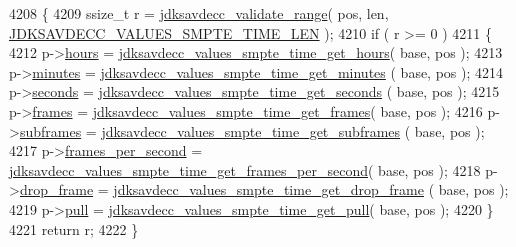 \begin{DoxyCode}
4208 \{
4209     ssize\_t r = \hyperlink{group__util_ga9c02bdfe76c69163647c3196db7a73a1}{jdksavdecc\_validate\_range}( pos, len, 
      \hyperlink{group__values__smpte__time_ga479451e2d80f4c927b20ef6007ff18d7}{JDKSAVDECC\_VALUES\_SMPTE\_TIME\_LEN} );
4210     \textcolor{keywordflow}{if} ( r >= 0 )
4211     \{
4212         p->\hyperlink{structjdksavdecc__values__smpte__time_a014d9515f8559b76acebf4a055130385}{hours} = \hyperlink{group__values__smpte__time_ga7f7cf39f2ab761c9b1b52e0e7285e8c6}{jdksavdecc\_values\_smpte\_time\_get\_hours}( base,
       pos );
4213         p->\hyperlink{structjdksavdecc__values__smpte__time_a7acca8be0094a19be6e308ac05924c4f}{minutes} = \hyperlink{group__values__smpte__time_ga97a364b9696c06dfb0bbbfe965f2947d}{jdksavdecc\_values\_smpte\_time\_get\_minutes}
      ( base, pos );
4214         p->\hyperlink{structjdksavdecc__values__smpte__time_a46729a903be1a03cdb248fb48d84d4f5}{seconds} = \hyperlink{group__values__smpte__time_gab8ec4bcfb3994ccb1b5986d426fcdc49}{jdksavdecc\_values\_smpte\_time\_get\_seconds}
      ( base, pos );
4215         p->\hyperlink{structjdksavdecc__values__smpte__time_ae45acaaf86f2d2177e4daa08f28ded47}{frames} = \hyperlink{group__values__smpte__time_ga24e7326aa8f3f1d9396155ff7bdacbac}{jdksavdecc\_values\_smpte\_time\_get\_frames}( 
      base, pos );
4216         p->\hyperlink{structjdksavdecc__values__smpte__time_a8f5ca74703be041d4572e5ae886bd487}{subframes} = \hyperlink{group__values__smpte__time_ga8448f1d4356bb0e771975fd163f6ef81}{jdksavdecc\_values\_smpte\_time\_get\_subframes}
      ( base, pos );
4217         p->\hyperlink{structjdksavdecc__values__smpte__time_a216a45b8a2d7b6aede4316aad0142121}{frames\_per\_second} = 
      \hyperlink{group__values__smpte__time_ga551e3edf0737b4d69f05211661c2532c}{jdksavdecc\_values\_smpte\_time\_get\_frames\_per\_second}( base,
       pos );
4218         p->\hyperlink{structjdksavdecc__values__smpte__time_a9007da8de1dceae90e4e7b85f540333c}{drop\_frame} = \hyperlink{group__values__smpte__time_ga4a7ccd1f7309a15e314f8bc428ce5aa5}{jdksavdecc\_values\_smpte\_time\_get\_drop\_frame}
      ( base, pos );
4219         p->\hyperlink{structjdksavdecc__values__smpte__time_a717d3a27db8fc0b8bbb7130fcf9e5c73}{pull} = \hyperlink{group__values__smpte__time_ga178d6c008a67cfc49e748b4d0ad63c20}{jdksavdecc\_values\_smpte\_time\_get\_pull}( base, pos
       );
4220     \}
4221     \textcolor{keywordflow}{return} r;
4222 \}
\end{DoxyCode}


